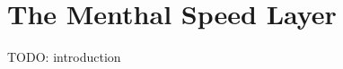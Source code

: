\chapter{The Menthal Speed Layer}
\label{chap:menthal_backend_architecture}

TODO: introduction










